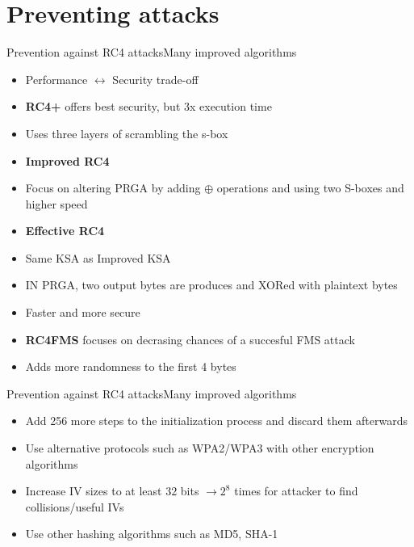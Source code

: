 \documentclass[
	aspectratio=169,	%
	onlytextwidth,		%
	t,					%
	]{beamer}
\begin{document}
\section{Preventing attacks}

\begin{frame}[fragile]{Prevention against RC4 attacks}{Many improved algorithms}
	\begin{itemize}
		\item Performance $\leftrightarrow$ Security trade-off
		\item \textbf{RC4+} offers best security, but 3x execution time
		\item Uses three layers of scrambling the s-box 
		\item \textbf{Improved RC4}
		\item Focus on altering PRGA by adding $\oplus$ operations and using two S-boxes and higher speed
		\item \textbf{Effective RC4}
		\item Same KSA as Improved KSA 
		\item IN PRGA, two output bytes are produces and XORed with plaintext bytes
		\item Faster and more secure
		\item \textbf{RC4FMS} focuses on decrasing chances of a succesful FMS attack
		\item Adds more randomness to the first 4 bytes 
	\end{itemize}
\end{frame}

\begin{frame}[fragile]{Prevention against RC4 attacks}{Many improved algorithms}
	\begin{itemize}
		\item Add 256 more steps to the initialization process and discard them afterwards
		\item Use alternative protocols such as WPA2/WPA3 with other encryption algorithms
		\item Increase IV sizes to at least $32$ bits $\rightarrow 2^{8}$ times for attacker to find collisions/useful IVs
		\item Use other hashing algorithms such as MD5, SHA-1
	\end{itemize}
\end{frame}

\appendix
\makethankyou


\section{\appendixname}
\end{document}
